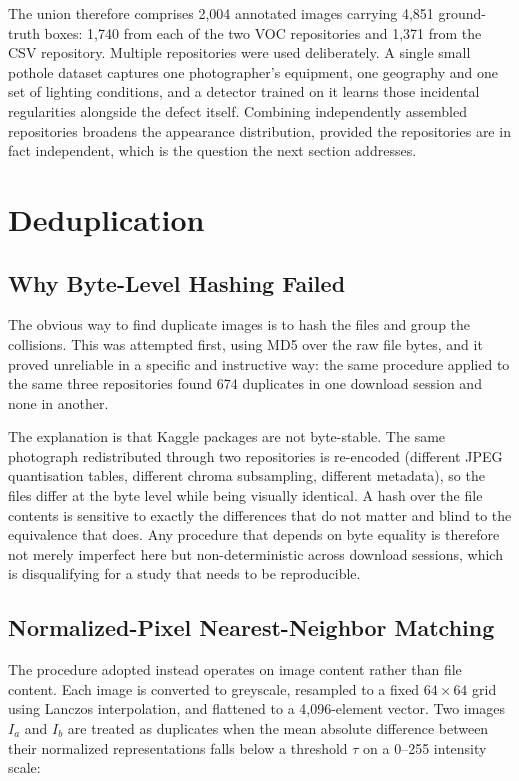 \documentclass[MScCS]{uccthesis}
\begin{document}
The union therefore comprises 2,004 annotated images carrying 4,851
ground-truth boxes: 1,740 from each of the two VOC repositories and 1,371 from
the CSV repository. Multiple repositories were used deliberately. A
single small pothole dataset captures one photographer's equipment, one
geography and one set of lighting conditions, and a detector trained on it
learns those incidental regularities alongside the defect itself. Combining
independently assembled repositories broadens the appearance distribution, provided the repositories are in fact independent, which is the question the
next section addresses.

\section{Deduplication}
\label{sec:dedup}

\subsection{Why Byte-Level Hashing Failed}

The obvious way to find duplicate images is to hash the files and group the
collisions. This was attempted first, using MD5 over the raw file bytes, and it
proved unreliable in a specific and instructive way: the same procedure applied
to the same three repositories found 674 duplicates in one download session and
none in another.

The explanation is that Kaggle packages are not byte-stable. The same
photograph redistributed through two repositories is re-encoded (different
JPEG quantisation tables, different chroma subsampling, different metadata), so the files differ at the byte level while being visually identical. A hash
over the file contents is sensitive to exactly the differences that do not
matter and blind to the equivalence that does. Any procedure that depends on
byte equality is therefore not merely imperfect here but non-deterministic
across download sessions, which is disqualifying for a study that needs to be
reproducible.

\subsection{Normalized-Pixel Nearest-Neighbor Matching}

The procedure adopted instead operates on image content rather than file
content. Each image is converted to greyscale, resampled to a fixed
$64 \times 64$ grid using Lanczos interpolation, and flattened to a
4,096-element vector. Two images $I_a$ and $I_b$ are treated as duplicates when
the mean absolute difference between their normalized representations falls
below a threshold $\tau$ on a 0--255 intensity scale:
\end{document}
